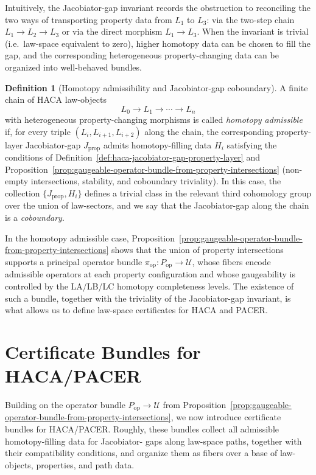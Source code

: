 \documentclass[11pt]{book}
\theoremstyle{plain}
\theoremstyle{definition}
\newtheorem{definition}[theorem]{Definition}
\theoremstyle{remark}
\begin{document}
Intuitively, the Jacobiator-gap invariant records the obstruction to
reconciling the two ways of transporting property data from $L_1$ to
$L_3$: via the two-step chain $L_1\to L_2\to L_3$ or via the direct
morphism $L_1\to L_3$. When the invariant is trivial (i.e.\
law-space equivalent to zero), higher homotopy data can be chosen to
fill the gap, and the corresponding heterogeneous property-changing
data can be organized into well-behaved bundles.

\begin{definition}[Homotopy admissibility and Jacobiator-gap coboundary]
\label{def:homotopy-admissible-jgap}
A finite chain of HACA law-objects
\[
  L_0\to L_1\to\cdots\to L_n
\]
with heterogeneous property-changing morphisms is called
\emph{homotopy admissible} if, for every triple $(L_i,L_{i+1},L_{i+2})$
along the chain, the corresponding property-layer Jacobiator-gap
$J_{\mathrm{prop}}$ admits homotopy-filling data $H_i$ satisfying the
conditions of
Definition~\ref{def:haca-jacobiator-gap-property-layer} and
Proposition~\ref{prop:gaugeable-operator-bundle-from-property-intersections}
(non-empty intersections, stability, and coboundary triviality). In
this case, the collection $\{J_{\mathrm{prop}},H_i\}$ defines a
trivial class in the relevant third cohomology group over the union
of law-sectors, and we say that the Jacobiator-gap along the chain is
a \emph{coboundary}.
\end{definition}

In the homotopy admissible case,
Proposition~\ref{prop:gaugeable-operator-bundle-from-property-intersections}
shows that the union of property intersections supports a principal
operator bundle $\pi_{\mathrm{op}}:P_{\mathrm{op}}\to\mathcal{U}$,
whose fibers encode admissible operators at each property configuration
and whose gaugeability is controlled by the LA/LB/LC homotopy
completeness levels. The existence of such a bundle, together with
the triviality of the Jacobiator-gap invariant, is what allows us to
define law-space certificates for HACA and PACER.



\section[Certificate Bundles for HACA/PACER]{Certificate Bundles for HACA/PACER}


Building on the operator bundle $P_{\mathrm{op}}\to\mathcal{U}$ from
Proposition~\ref{prop:gaugeable-operator-bundle-from-property-intersections},
we now introduce certificate bundles for HACA/PACER. Roughly, these
bundles collect all admissible homotopy-filling data for Jacobiator-
gaps along law-space paths, together with their compatibility
conditions, and organize them as fibers over a base of law-objects,
properties, and path data.
\end{document}
